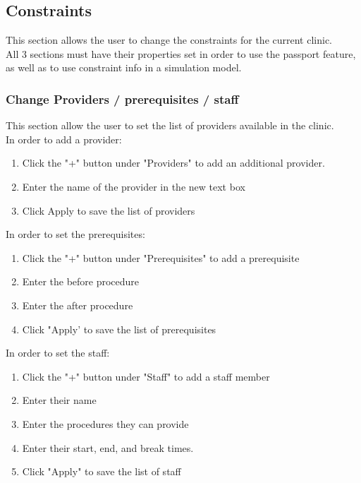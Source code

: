 \documentclass[12pt]{article}
\begin{document}
\subsection{Constraints}
This section allows the user to change the constraints for the current clinic.\\

All 3 sections must have their properties set in order to use the passport feature, as well as to use constraint info in a simulation model.\\

\subsubsection{Change Providers / prerequisites / staff}
This section allow the user to set the list of providers available in the clinic.\\

In order to add a provider:
\begin{enumerate}
\item Click the "+" button under "Providers" to add an additional provider.
\item  Enter the name of the provider in the new text box
\item Click Apply to save the list of providers
\end{enumerate}

In order to set the prerequisites:\\
\begin{enumerate}
\item Click the "+" button under "Prerequisites" to add a prerequisite
\item Enter the before procedure
\item Enter the after procedure
\item Click "Apply' to save the list of prerequisites
\end{enumerate}

In order to set the staff:
\begin{enumerate}
\item Click the "+" button under "Staff" to add a staff member
\item Enter their name
\item Enter the procedures they can provide
\item Enter their start, end, and break times.
\item Click "Apply" to save the list of staff
\end{enumerate}
\end{document}
